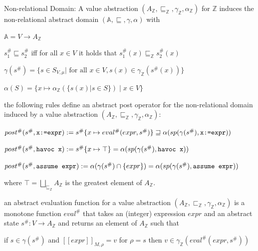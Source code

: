 \documentclass[landscape, a4paper]{article}
\begin{document}
\begin{minipage}[t]{0.2\linewidth}
\begin{betterlist}
\begin{betterlist}
\begin{betterlist}
			\end{betterlist}
		\end{betterlist}
		\item \alert{Non-relational Domain:} A value abstraction $(A_{\mathbb{Z}}, \sqsubseteq_{\mathbb{Z}}, \gamma_{\mathbb{Z}}, \alpha_{\mathbb{Z}})$ for $\mathbb{Z}$ induces the \alert{non-relational abstract domain} $(\mathbb{A}, \sqsubseteq, \gamma, \alpha)$ with
		\begin{betterlist}
			\item $\mathbb{A} = V \rightarrow A_{\mathbb{Z}}$
			\item $s^\#_1 \sqsubseteq s^\#_2$ iff for all $x \in V$ it holds that $s^\#_1(x) \sqsubseteq_{\mathbb{Z}} s^\#_2(x)$
			\item $\gamma(s^\#) = \{s \in S_{V ,\mu} | \text{ for all } x \in V, s(x) \in \gamma_{\mathbb{Z}}(s^\#(x))\}$
			\item $\alpha(S) = \{x \mapsto \alpha_{\mathbb{Z}}(\{s(x) | s \in S\}) \mid x \in V\}$
			\item {}
			\item the following rules define an abstract post operator for the non-relational domain induced by a value abstraction $(A_{\mathbb{Z}}, \sqsubseteq_{\mathbb{Z}}, \gamma_{\mathbb{Z}}, \alpha_{\mathbb{Z}})$:
			\begin{betterlist}
				\item $post^\#(s^\#, \verb|x:=expr|) := s^\#\{x \mapsto eval^\#(expr, s^\#)\} \sqsupseteq \alpha(sp(\gamma(s^\#), \verb|x:=expr|))$
				\item $post^\#(s^\#, \verb|havoc x|) := s^\#\{x \mapsto \top\} = \alpha(sp(\gamma(s^\#), \verb|havoc x|))$
				\item $post^\#(s^\#, \verb|assume expr|) := \alpha(\gamma(s^\#) \cap \{expr\}) = \alpha(sp(\gamma(s^\#), \verb|assume expr|))$
			\end{betterlist}
			where $\top= \bigsqcup_{\sqsubseteq_{\mathbb{Z}}} A_{\mathbb{Z}}$ is the greatest element of $A_{\mathbb{Z}}$. 
		\end{betterlist}
		\item an \alert{abstract evaluation function} for a value abstraction $(A_{\mathbb{Z}}, \sqsubset_{\mathbb{Z}}, \gamma_{\mathbb{Z}}, \alpha_{\mathbb{Z}})$ is a monotone function $eval^\#$ that takes an (integer) expression $expr$ and an abstract state $s^\#: V \rightarrow A_{\mathbb{Z}}$ and returns an element of $A_{\mathbb{Z}}$ such that
		\begin{betterlist}
			\item if $s \in \gamma(s^\#)$ and $[[expr]]_{M,\rho} = v$ for $\rho = s$ then $v \in \gamma_{\mathbb{Z}}(eval^\#(expr, s^\#))$

\end{betterlist}
\end{betterlist}
\end{minipage}
\end{document}
